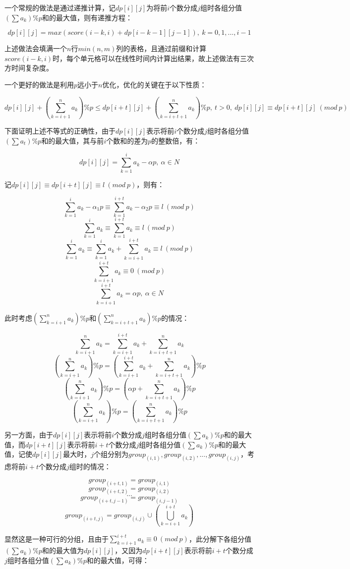 \documentclass{article}
\begin{document}
一个常规的做法是通过递推计算，记$dp[i][j]$为将前$i$个数分成$j$组时各组分值$(\sum{a_k})\%p$和的最大值，则有递推方程：

$$
dp[i][j]=max(score(i-k,i)+dp[i-k-1][j-1]),\ k=0,1,...,i-1
$$

上述做法会填满一个$n$行$min(n,m)$列的表格，且通过前缀和计算$score(i-k,i)$时，每个单元格可以在线性时间内计算出结果，故上述做法有三次方时间复杂度。

一个更好的做法是利用$p$远小于$n$优化，优化的关键在于以下性质：

$$
dp[i][j]+(\sum_{k=i+1}^n{a_k})\%p\le{dp}[i+t][j]+(\sum_{k=i+t+1}^n{a_k})\%p,\ t>0,\  dp[i][j]\equiv{dp}[i+t][j]\ (mod\ p)
$$

下面证明上述不等式的正确性，由于$dp[i][j]$表示将前$i$个数分成$j$组时各组分值$(\sum{a_t})\%p$和的最大值，其与前$i$个数和的差为$p$的整数倍，有：

$$
dp[i][j]=\sum_{k=1}^ia_k-\alpha{p},\ \alpha\in{N}
$$

记$dp[i][j]\equiv{dp}[i+t][j]\equiv{l}\ (mod\ p)$，则有：

$$
\sum_{k=1}^ia_k-\alpha_1p\equiv\sum_{k=1}^{i+t}a_k-\alpha_2p\equiv{l}\ (mod\ p)
$$
$$
\sum_{k=1}^ia_k\equiv\sum_{k=1}^{i+t}a_k\equiv{l}\ (mod\ p)
$$
$$
\sum_{k=1}^ia_k\equiv\sum_{k=1}^ia_k+\sum_{k=i+1}^{i+t}a_k\equiv{l}\ (mod\ p)
$$
$$
\sum_{k=i+1}^{i+t}a_k\equiv0\ (mod\ p)
$$
$$
\sum_{k=i+1}^{i+t}a_k=\alpha{p},\ \alpha\in{N}
$$

此时考虑$(\sum_{k=i+1}^n{a_k})\%p$和$(\sum_{k=i+t+1}^n{a_k})\%p$的情况：

$$
\sum_{k=i+1}^n{a_k}=\sum_{k=i+1}^{i+t}a_k+\sum_{k=i+t+1}^n{a_k}
$$
$$
(\sum_{k=i+1}^n{a_k})\%p=(\sum_{k=i+1}^{i+t}a_k+\sum_{k=i+t+1}^n{a_k})\%p
$$
$$
(\sum_{k=i+1}^n{a_k})\%p=(\alpha{p}+\sum_{k=i+t+1}^n{a_k})\%p
$$
$$
(\sum_{k=i+1}^n{a_k})\%p=(\sum_{k=i+t+1}^n{a_k})\%p
$$

另一方面，由于$dp[i][j]$表示将前$i$个数分成$j$组时各组分值$(\sum{a_k})\%p$和的最大值，而$dp[i+t][j]$表示将前$i+t$个数分成$j$组时各组分值$(\sum{a_k})\%p$和的最大值，记使$dp[i][j]$最大时，$j$个组分别为$group_{(i,1)},group_{(i,2)},...,group_{(i,j)}$，考虑将前$i+t$个数分成$j$组时的情况：

$$
group_{(i+t,1)}=group_{(i,1)}
$$
$$
group_{(i+t,2)}=group_{(i,2)}
$$
$$
...
$$
$$
group_{(i+t,j-1)}=group_{(i,j-1)}
$$
$$
group_{(i+t,j)}=group_{(i,j)}\cup(\bigcup_{k=i+1}^{i+t}a_k)
$$

显然这是一种可行的分组，且由于$\sum_{k=i+1}^{i+t}a_k\equiv0\ (mod\ p)$，此分解下各组分值$(\sum{a_k})\%p$和的最大值为$dp[i][j]$，又因为$dp[i+t][j]$表示将前$i+t$个数分成$j$组时各组分值$(\sum{a_k})\%p$和的最大值，可得：
\end{document}
